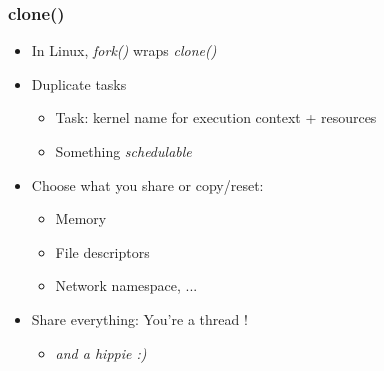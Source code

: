 \begin{frame}
  \frametitle{clone()}

  \begin{itemize}
  \item In Linux, \emph{fork()} wraps \emph{clone()}
  \item Duplicate tasks
    \begin{itemize}
    \item Task: kernel name for execution context + resources
    \item Something \emph{schedulable}
    \end{itemize}
  \item Choose what you share or copy/reset:
    \begin{itemize}
    \item Memory
    \item File descriptors
    \item Network namespace, ...
    \end{itemize}
  \item Share everything: You're a thread !
    \begin{itemize}
    \item \emph{and a hippie :)}
    \end{itemize}
  \end{itemize}
\end{frame}
